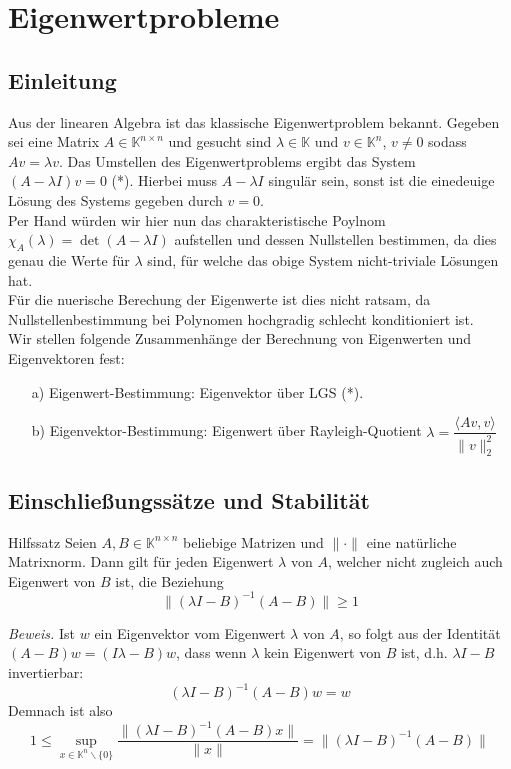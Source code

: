 \section{Eigenwertprobleme}

\subsection{Einleitung}
Aus der linearen Algebra ist das klassische Eigenwertproblem bekannt. Gegeben sei eine Matrix 
$A\in\mathbb{K}^{n\times n}$ und gesucht sind $\lambda\in\mathbb{K}$ und $v\in\mathbb{K}^n$, $v\neq 0$ 
sodass $Av=\lambda v$. Das Umstellen des Eigenwertproblems ergibt das System $(A-\lambda I)v=0$ (*). Hierbei muss 
$A-\lambda I$ singulär sein, sonst ist die einedeuige Lösung des Systems gegeben durch $v=0$.\\
Per Hand würden wir hier nun das charakteristische Poylnom $\chi_A(\lambda)=\det(A-\lambda I)$ aufstellen und 
dessen Nullstellen bestimmen, da dies genau die Werte für $\lambda$ sind, für welche das obige System nicht-triviale
Lösungen hat. \\
Für die nuerische Berechung der Eigenwerte ist dies nicht ratsam, da Nullstellenbestimmung bei Polynomen 
hochgradig schlecht konditioniert ist. \\
Wir stellen folgende Zusammenhänge der Berechnung von Eigenwerten und Eigenvektoren fest:
\begin{enumerate}
    \item[a)] Eigenwert-Bestimmung: Eigenvektor über LGS (*).
    \item[b)] Eigenvektor-Bestimmung: 
        Eigenwert über Rayleigh-Quotient $\lambda=\dfrac{\langle Av,v\rangle}{\|v\|_2^2}$ 
\end{enumerate}
\subsection{Einschließungssätze und Stabilität}
\begin{thmbox}{Hilfssatz}
    Seien $A,B\in\mathbb{K}^{n\times n}$ beliebige Matrizen und $\|\cdot\|$ eine natürliche Matrixnorm. Dann gilt 
    für jeden Eigenwert $\lambda$ von $A$, welcher nicht zugleich auch Eigenwert von $B$ ist, die Beziehung
    \[\|(\lambda I-B)^{-1}(A-B)\|\geq 1\]
\end{thmbox}
\textit{Beweis.} Ist $w$ ein Eigenvektor vom Eigenwert $\lambda$ von $A$, so folgt aus der Identität 
$(A-B)w = (I\lambda - B)w$, dass wenn $\lambda$ kein Eigenwert von $B$ ist, d.h. $\lambda I-B$ invertierbar: 
\[(\lambda I-B)^{-1}(A-B)w=w\]
Demnach ist also 
\[1\leq \sup_{x\in\mathbb{K}^n\backslash\{0\}} \dfrac{\|(\lambda I-B)^{-1}(A-B)x\|}{\|x\|}
=\|(\lambda I-B)^{-1}(A-B)\|\]
